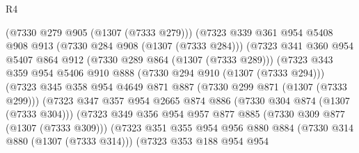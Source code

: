\begin{lexlean}{R4}
\begin{coremodule}
                        (@7330 @279 @905 (@1307 (@7333 @279)))
                        (@7323
                          @339
                          @361
                          @954
                          @5408
                          @908
                          @913
                          (@7330 @284 @908 (@1307 (@7333 @284)))
                          (@7323
                            @341
                            @360
                            @954
                            @5407
                            @864
                            @912
                            (@7330 @289 @864 (@1307 (@7333 @289)))
                            (@7323
                              @343
                              @359
                              @954
                              @5406
                              @910
                              @888
                              (@7330 @294 @910 (@1307 (@7333 @294)))
                              (@7323
                                @345
                                @358
                                @954
                                @4649
                                @871
                                @887
                                (@7330 @299 @871 (@1307 (@7333 @299)))
                                (@7323
                                  @347
                                  @357
                                  @954
                                  @2665
                                  @874
                                  @886
                                  (@7330 @304 @874 (@1307 (@7333 @304)))
                                  (@7323
                                    @349
                                    @356
                                    @954
                                    @957
                                    @877
                                    @885
                                    (@7330 @309 @877 (@1307 (@7333 @309)))
                                    (@7323
                                      @351
                                      @355
                                      @954
                                      @956
                                      @880
                                      @884
                                      (@7330 @314 @880 (@1307 (@7333 @314)))
                                      (@7323
                                        @353
                                        @188
                                        @954
                                        @954

\end{coremodule}
\end{lexlean}
